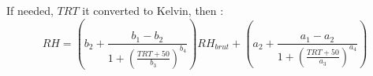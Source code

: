 If needed, $TRT$ it converted to Kelvin, then :
\[
RH = \left(b_2 + 
      \frac{b_1 - b_2}{1 + \left(\frac{TRT + 50 }{b_3}\right)^{b_4}}
     \right)
  RH_{brut}
+ \left(a_2 + 
      \frac{a_1 - a_2}{1 + \left(\frac{TRT + 50 }{a_3}\right)^{a_4}}
     \right)
\]

